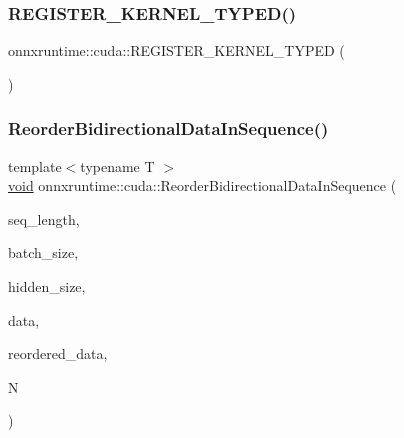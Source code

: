 \subsubsection{\texorpdfstring{R\+E\+G\+I\+S\+T\+E\+R\+\_\+\+K\+E\+R\+N\+E\+L\+\_\+\+T\+Y\+P\+E\+D()}{REGISTER\_KERNEL\_TYPED()}\hspace{0.1cm}{\footnotesize\ttfamily [3/3]}}
{\footnotesize\ttfamily onnxruntime\+::cuda\+::\+R\+E\+G\+I\+S\+T\+E\+R\+\_\+\+K\+E\+R\+N\+E\+L\+\_\+\+T\+Y\+P\+ED (\begin{DoxyParamCaption}\item[{\mbox{\hyperlink{uniononnxruntime_1_1MLFloat16}{M\+L\+Float16}}}]{ }\end{DoxyParamCaption})}

\mbox{\label{namespaceonnxruntime_1_1cuda_ace6d5943a8e890cfde1d3638b886fdcd}} 
\subsubsection{\texorpdfstring{Reorder\+Bidirectional\+Data\+In\+Sequence()}{ReorderBidirectionalDataInSequence()}}
{\footnotesize\ttfamily template$<$typename T $>$ \\
\mbox{\hyperlink{mlasi_8h_a88f941d423cb2a819b70a1358982b1a6}{void}} onnxruntime\+::cuda\+::\+Reorder\+Bidirectional\+Data\+In\+Sequence (\begin{DoxyParamCaption}\item[{const int32\+\_\+t}]{seq\+\_\+length,  }\item[{const int32\+\_\+t}]{batch\+\_\+size,  }\item[{const int32\+\_\+t}]{hidden\+\_\+size,  }\item[{const T $\ast$}]{data,  }\item[{T $\ast$}]{reordered\+\_\+data,  }\item[{const \mbox{\hyperlink{mlasi_8h_a503efbc1c6e50825320ad909366b78ab}{size\+\_\+t}}}]{N }\end{DoxyParamCaption})}

\mbox{\label{namespaceonnxruntime_1_1cuda_a50c0e5c797779509d0ec1d12b475f238}} 
